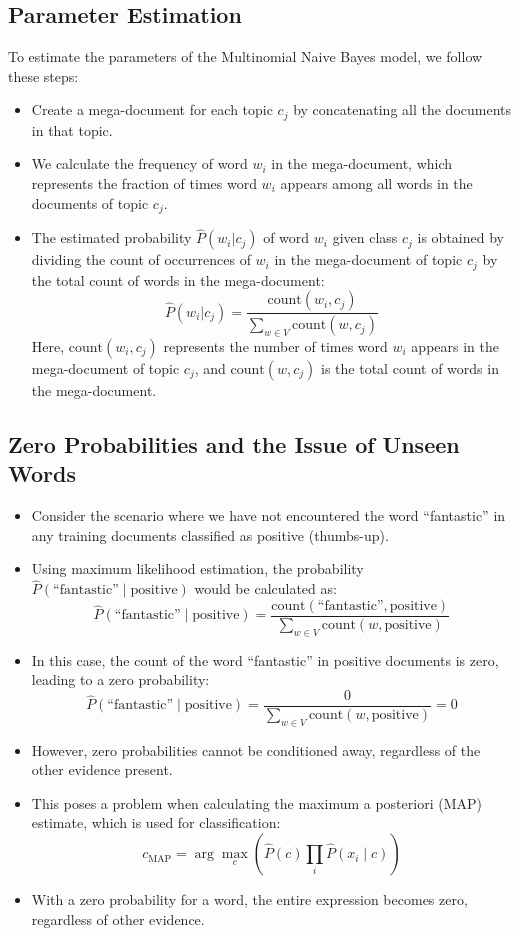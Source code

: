 \documentclass{book}
\begin{document}
\subsection{Parameter Estimation}

To estimate the parameters of the Multinomial Naive Bayes model, we follow these steps:

\begin{itemize}
  \item Create a mega-document for each topic $c_j$ by concatenating all the documents in that topic.
  \item We calculate the frequency of word $w_i$ in the mega-document, which represents the fraction of times word $w_i$ appears among all words in the documents of topic $c_j$.
  \item The estimated probability $\hat{P}(w_i | c_j)$ of word $w_i$ given class $c_j$ is obtained by dividing the count of occurrences of $w_i$ in the mega-document of topic $c_j$ by the total count of words in the mega-document:
  \[
  \hat{P}(w_i | c_j) = \frac{{\text{{count}}(w_i, c_j)}}{\sum_{w\in V}{\text{{count}}(w, c_j)}}
  \]
  Here, $\text{{count}}(w_i, c_j)$ represents the number of times word $w_i$ appears in the mega-document of topic $c_j$, and $\text{{count}}(w, c_j)$ is the total count of words in the mega-document.
\end{itemize}


\subsection{Zero Probabilities and the Issue of Unseen Words}
\begin{itemize}
    \item Consider the scenario where we have not encountered the word ``fantastic'' in any training documents classified as positive (thumbs-up).
    \item Using maximum likelihood estimation, the probability $\hat{P}(\text{``fantastic''} \mid \text{positive})$ would be calculated as:
    \[
    \hat{P}(\text{``fantastic''} \mid \text{positive}) = \frac{\text{count}(\text{``fantastic''}, \text{positive})}{\sum_{w \in V} \text{count}(w, \text{positive})}
    \]
    \item In this case, the count of the word ``fantastic'' in positive documents is zero, leading to a zero probability:
    \[
    \hat{P}(\text{``fantastic''} \mid \text{positive}) = \frac{0}{\sum_{w \in V} \text{count}(w, \text{positive})} = 0
    \]
    \item However, zero probabilities cannot be conditioned away, regardless of the other evidence present.
    \item This poses a problem when calculating the maximum a posteriori (MAP) estimate, which is used for classification:
    \[
    c_{\text{MAP}} = \arg\max_c \left(\hat{P}(c) \prod_{i} \hat{P}(x_i \mid c)\right)
    \]
    \item With a zero probability for a word, the entire expression becomes zero, regardless of other evidence.
\end{itemize}
\end{document}
